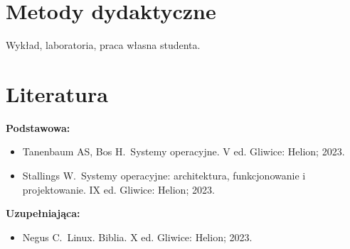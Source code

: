 \documentclass[12pt, a4paper]{article}
\begin{document}
\section{Metody dydaktyczne}

Wykład, laboratoria, praca własna studenta.

\section{Literatura}

\textbf{Podstawowa:}
\begin{itemize}
  \item Tanenbaum AS, Bos H. Systemy operacyjne. V ed. Gliwice: Helion; 2023.
  \item Stallings W. Systemy operacyjne: architektura, funkcjonowanie i projektowanie. IX ed. Gliwice: Helion; 2023.
\end{itemize}

\textbf{Uzupełniająca:}
\begin{itemize}
  \item Negus C. Linux. Biblia. X ed. Gliwice: Helion; 2023.
\end{itemize}
\end{document}
